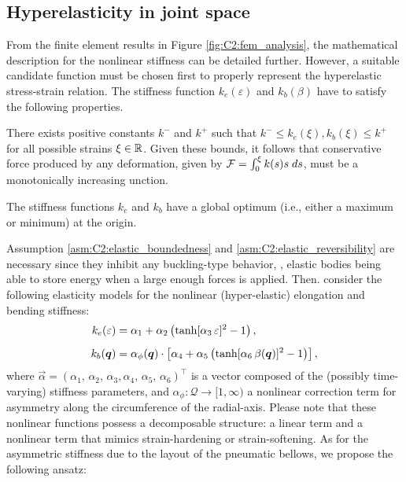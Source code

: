 \subsection{Hyperelasticity  in joint space}
\label{sec:C2:hyperelastic}
\noindent From the finite element results in Figure \ref{fig:C2:fem_analysis}, the mathematical description for the nonlinear stiffness can be detailed further. However, a suitable candidate function must be chosen first to properly represent the hyperelastic stress-strain relation. The stiffness function $k_e (\varepsilon)$ and $k_b (\beta)$  have to satisfy the following properties.
%
\begin{asm}
\label{asm:C2:elastic_boundedness}
There exists positive constants ${k}^{-}$ and ${k}^{+}$ such that ${k}^{-} \le k_e(\xi),k_b(\xi) \le {k}^{+}$ for all possible strains $\xi \in \mathbb{R}$.  Given these bounds, it follows that conservative force produced by any deformation, given by ${\mathcal{F}} = \int_0^\xi k(s)s\;ds$, must be a monotonically increasing unction.  
\end{asm}
%
\begin{asm}
\label{asm:C2:elastic_reversibility}
The stiffness functions $k_e$ and $k_b$ have a global optimum (i.e., either a maximum or minimum) at the origin. 
\end{asm}
%
Assumption \ref{asm:C2:elastic_boundedness} and \ref{asm:C2:elastic_reversibility} are necessary since  they inhibit any buckling-type behavior, \ie, elastic bodies being able to store energy when a large enough forces is applied. Then. consider the following elasticity models for the nonlinear (hyper-elastic) elongation and bending stiffness:
%
\begin{align}
\label{eq:C2:stiffness_tanh_eps}
{k}_e(\varepsilon) & = \alpha_1 + \alpha_2 \left( \tanh[\alpha_3\,\varepsilon]^2 - 1 \right), \\[0.5em]
\label{eq:C2:stiffness_tanh_beta}
{k}_b({\boldsymbol{q}})  & = \alpha_{\phi}({\boldsymbol{q}}) \cdot \left[\alpha_4 + \alpha_5 \left( \tanh[\alpha_6\,\beta({\boldsymbol{q}})]^2 - 1 \right)\right], 
\end{align}
%
where $\vec{\alpha} = \left(\alpha_1,\,\alpha_2,\,\alpha_3,\alpha_4,\,\alpha_5,\,\alpha_6 \right)^\top$ is a vector composed of the (possibly time-varying) stiffness parameters, and $\alpha_\phi: \mathcal{Q} \to [1,\infty)$ a nonlinear correction term for asymmetry along the circumference of the radial-axis. Please note that these nonlinear functions possess a decomposable structure: a linear term and a nonlinear term that mimics strain-hardening or strain-softening. As for the asymmetric stiffness due to the layout of the pneumatic bellows, we propose the following ansatz:
